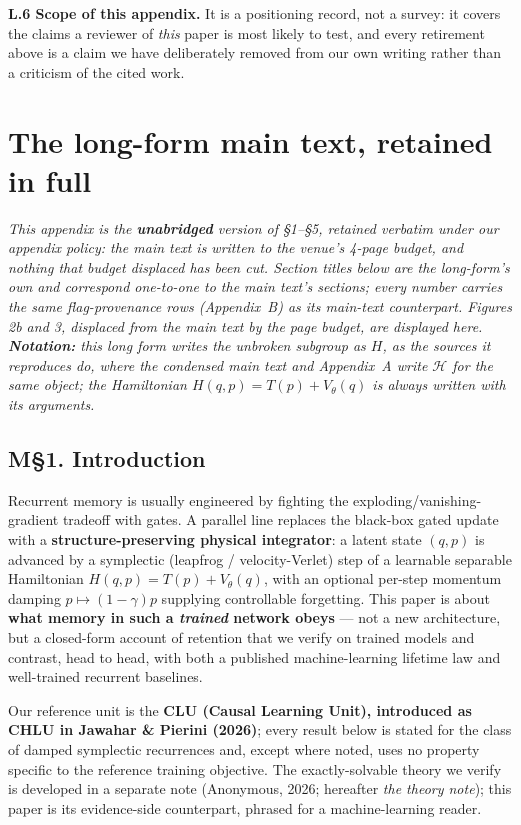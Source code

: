 \documentclass[10pt]{article}
\begin{document}
\textbf{L.6 Scope of this appendix.} It is a positioning record, not a survey: it covers the claims a reviewer of \emph{this} paper is most likely to test, and every retirement above is a claim we have deliberately removed from our own writing rather than a criticism of the cited work.

\section{The long-form main text, retained in full}\label{app:longform}
\emph{This appendix is the \textbf{unabridged} version of \S1--\S5, retained verbatim under our appendix policy: the main text is written to the venue's 4-page budget, and nothing that budget displaced has been cut. Section titles below are the long-form's own and correspond one-to-one to the main text's sections; every number carries the same flag-provenance rows (Appendix~B) as its main-text counterpart. Figures 2b and 3, displaced from the main text by the page budget, are displayed here. \textbf{Notation:} this long form writes the unbroken subgroup as $H$, as the sources it reproduces do, where the condensed main text and Appendix~A write $\mathcal H$ for the same object; the Hamiltonian $H(q,p)=T(p)+V_\theta(q)$ is always written with its arguments.}

\subsection*{M\S1. Introduction}

Recurrent memory is usually engineered by fighting the exploding/vanishing-gradient tradeoff with gates. A parallel line replaces the black-box gated update with a \textbf{structure-preserving physical integrator}: a latent state $(q,p)$ is advanced by a symplectic (leapfrog / velocity-Verlet) step of a learnable separable Hamiltonian $H(q,p)=T(p)+V_\theta(q)$, with an optional per-step momentum damping $p\mapsto(1-\gamma)p$ supplying controllable forgetting. This paper is about \textbf{what memory in such a \emph{trained} network obeys} --- not a new architecture, but a closed-form account of retention that we verify on trained models and contrast, head to head, with both a published machine-learning lifetime law and well-trained recurrent baselines.

Our reference unit is the \textbf{CLU (Causal Learning Unit), introduced as CHLU in Jawahar \& Pierini (2026)}; every result below is stated for the class of damped symplectic recurrences and, except where noted, uses no property specific to the reference training objective. The exactly-solvable theory we verify is developed in a separate note (Anonymous, 2026; hereafter \emph{the theory note}); this paper is its evidence-side counterpart, phrased for a machine-learning reader.
\end{document}
